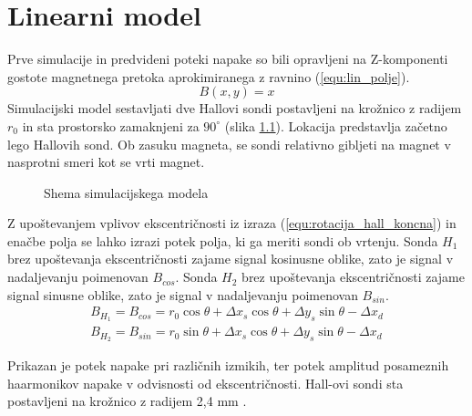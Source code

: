 \chapter{Linearni model}

Prve simulacije in predvideni poteki napake so bili opravljeni na Z-komponenti gostote magnetnega pretoka aprokimiranega z ravnino (\ref{equ:lin_polje}).
\begin{equation}
\label{equ:lin_polje}
B(x,y)= x
\end{equation}
Simulacijski model sestavljati dve Hallovi sondi postavljeni na krožnico z radijem $r_0$ in sta prostorsko zamaknjeni za $90^\circ$ (slika \ref{lin_simul}). Lokacija predstavlja začetno lego Hallovih sond. 
Ob zasuku magneta, se sondi relativno gibljeti na magnet v nasprotni smeri kot se vrti magnet. 
\begin{figure}[h!]
	\centering
	\caption{Shema simulacijskega modela}
	\label{lin_simul}
\end{figure}

Z upoštevanjem vplivov ekscentričnosti iz izraza (\ref{equ:rotacija_hall_koncna}) in enačbe polja se lahko izrazi potek polja, ki ga meriti sondi ob vrtenju. Sonda $H_1$ brez upoštevanja ekscentričnosti zajame signal kosinusne oblike, zato je signal v nadaljevanju poimenovan $B_{cos}$. Sonda $H_2$ brez upoštevanja ekscentričnosti zajame signal sinusne oblike, zato je signal v nadaljevanju poimenovan $B_{sin}$.
\begin{eqnarray}
B_{H_1}= B_{cos}= r_0 \cos \theta + \Delta x_s \cos \theta+ \Delta y_s \sin \theta -\Delta x_d\\
B_{H_2}= B_{sin}= r_0 \sin \theta + \Delta x_s \cos \theta+ \Delta y_s \sin \theta -\Delta x_d
\end{eqnarray}


Prikazan je potek napake pri različnih izmikih, ter potek amplitud posameznih haarmonikov napake v odvisnosti od ekscentričnosti.
Hall-ovi sondi sta postavljeni na krožnico z radijem 2,4 mm \cite{AM8192}.
